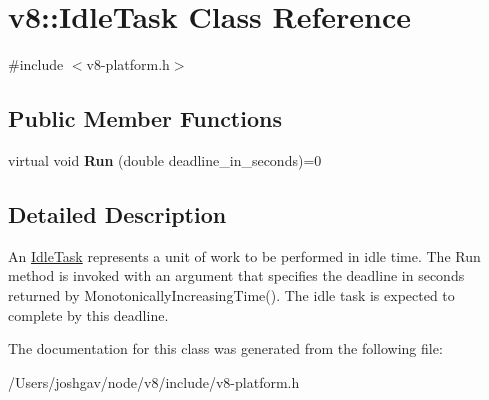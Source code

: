 \hypertarget{classv8_1_1_idle_task}{}\section{v8\+:\+:Idle\+Task Class Reference}
\label{classv8_1_1_idle_task}


{\ttfamily \#include $<$v8-\/platform.\+h$>$}

\subsection*{Public Member Functions}
\begin{DoxyCompactItemize}
\item 
virtual void {\bfseries Run} (double deadline\+\_\+in\+\_\+seconds)=0\hypertarget{classv8_1_1_idle_task_a4f2f238f551b3b2212adffcd5ee2f314}{}\label{classv8_1_1_idle_task_a4f2f238f551b3b2212adffcd5ee2f314}

\end{DoxyCompactItemize}


\subsection{Detailed Description}
An \hyperlink{classv8_1_1_idle_task}{Idle\+Task} represents a unit of work to be performed in idle time. The Run method is invoked with an argument that specifies the deadline in seconds returned by Monotonically\+Increasing\+Time(). The idle task is expected to complete by this deadline. 

The documentation for this class was generated from the following file\+:\begin{DoxyCompactItemize}
\item 
/\+Users/joshgav/node/v8/include/v8-\/platform.\+h\end{DoxyCompactItemize}
